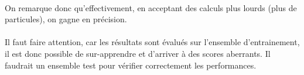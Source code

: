 \documentclass[a4paper, 11pt]{article}
\begin{document}
\paragraph{}On remarque donc qu'effectivement, en acceptant des calculs plus lourds (plus de particules), on gagne en précision.

\paragraph{}Il faut faire attention, car les résultats sont évalués sur l'ensemble d'entrainement, il est donc possible de sur-apprendre et
d'arriver à des scores aberrants. Il faudrait un ensemble test pour vérifier correctement les performances.
\end{document}
